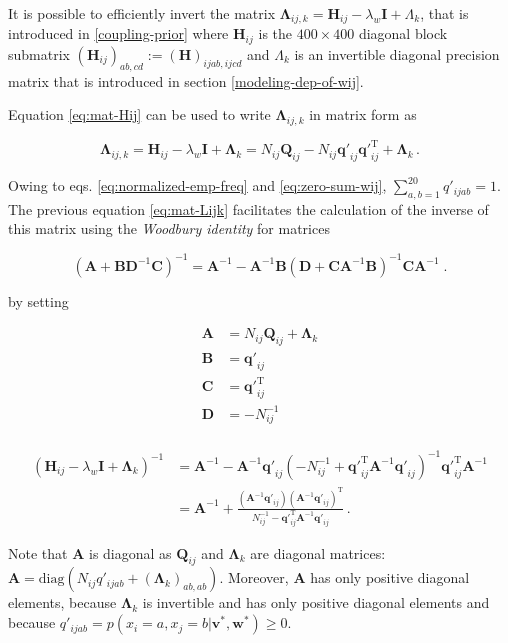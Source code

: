 \documentclass[12pt,a4paper,twoside]{book}
\newcommand{\eq}{\!=\!}
\renewcommand{\H}{\mathbf{H}}
\newcommand{\I}{\mathbf{I}}
\newcommand{\Lijk}{\mathbf{\Lambda}_{ij,k}}
\newcommand{\Lk}{\mathbf{\Lambda}_k}
\newcommand{\Qij}{\mathbf{Q}_{ij}}
\newcommand{\qij}{\mathbf{q\prime}_{ij}}
\renewcommand{\v}{\mathbf{v}}
\newcommand{\w}{\mathbf{w}}
\theoremstyle{definition}
\theoremstyle{definition}
\theoremstyle{remark}
\begin{document}
It is possible to efficiently invert the matrix
\(\Lijk = \H_{ij} - \lambda_w \I + \Lambda_k\), that is introduced in
\ref{coupling-prior} where \(\H_{ij}\) is the \(400 \times 400\)
diagonal block submatrix \((\H_{ij})_{ab,cd} := (\H)_{ijab,ijcd}\) and
\(\Lambda_k\) is an invertible diagonal precision matrix that is
introduced in section \ref{modeling-dep-of-wij}.

Equation \eqref{eq:mat-Hij} can be used to write \(\Lijk\) in matrix form
as

\begin{equation}
     \Lijk = \H_{ij} - \lambda_w \I + \Lk = N_{ij} \Qij- N_{ij} \qij \qij^{\mathrm{T}} + \Lk \,.
\label{eq:mat-Lijk}
\end{equation}

Owing to eqs. \eqref{eq:normalized-emp-freq} and \eqref{eq:zero-sum-wij},
\(\sum_{a,b=1}^{20} q'_{ijab} = 1\). The previous equation
\eqref{eq:mat-Lijk} facilitates the calculation of the inverse of this
matrix using the \emph{Woodbury identity} for matrices

\begin{equation}
    (\mathbf{A} + \mathbf{B} \mathbf{D}^{-1} \mathbf{C})^{-1} = \mathbf{A}^{-1} - \mathbf{A}^{-1} \mathbf{B} (\mathbf{D} + \mathbf{C} \mathbf{A}^{-1} \mathbf{B}) ^{-1} \mathbf{C} \mathbf{A}^{-1} \;. 
\end{equation}

by setting

\begin{align}
  \mathbf{A} &= N_{ij} \Qij + \Lk \\
  \mathbf{B} &= \qij \\
  \mathbf{C} &= \qij^\mathrm{T} \\
  \mathbf{D} &=- N_{ij}^{-1} \\
\end{align}

\begin{align}
      \left( \H_{ij} - \lambda_w \I + \Lk \right)^{-1} & = \mathbf{A}^{-1} - \mathbf{A}^{-1} \qij  \left( -N_{ij}^{-1}  + \qij^\mathrm{T} \mathbf{A}^{-1} \qij \right)^{-1}  \qij^\mathrm{T} \mathbf{A}^{-1} \\
     & = \mathbf{A}^{-1} + \frac{ (\mathbf{A}^{-1} \qij) (\mathbf{A}^{-1} \qij)^{\mathrm{T}} }{ N_{ij}^{-1} - \qij^\mathrm{T} \mathbf{A}^{-1} \qij} \,.
\label{eq:fast-inverse-mat-Lijk}
\end{align}

Note that \(\mathbf{A}\) is diagonal as \(\Qij\) and \(\Lk\) are
diagonal matrices:
\(\mathbf{A} = \text{diag}(N_{ij} q'_{ijab} + (\Lk)_{ab,ab})\).
Moreover, \(\mathbf{A}\) has only positive diagonal elements, because
\(\Lk\) is invertible and has only positive diagonal elements and
because \(q'_{ijab} = p(x_i \eq a, x_j \eq b | \v^*,\w^*) \ge 0\).
\end{document}
